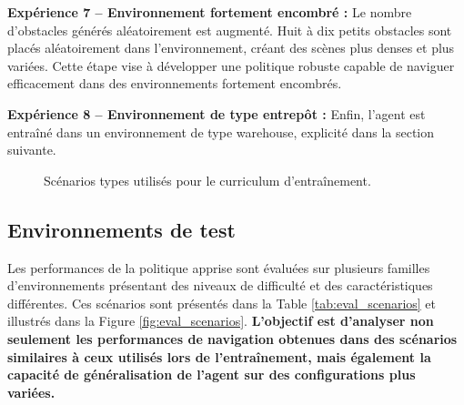 \vspace{10pt}

\noindent \textbf{Expérience 7 -- Environnement fortement encombré :} Le nombre d'obstacles générés aléatoirement est augmenté. Huit à dix petits obstacles sont placés aléatoirement dans l'environnement, créant des scènes plus denses et plus variées. Cette étape vise à développer une politique robuste capable de naviguer efficacement dans des environnements fortement encombrés.

\vspace{10pt}

\noindent \textbf{Expérience 8 -- Environnement de type entrepôt :} Enfin, l'agent est entraîné dans un environnement de type warehouse, explicité dans la section suivante.

\begin{figure}[h]
    \centering
    \caption{Scénarios types utilisés pour le curriculum d'entraînement.}
    \label{fig:training_scenarios}
\end{figure}



\subsection{Environnements de test}

\noindent Les performances de la politique apprise sont évaluées sur plusieurs familles d'environnements présentant des niveaux de difficulté et des caractéristiques différentes. Ces scénarios sont présentés dans la Table \ref{tab:eval_scenarios} et illustrés dans la Figure \ref{fig:eval_scenarios}. \textbf{L'objectif est d'analyser non seulement les performances de navigation obtenues dans des scénarios similaires à ceux utilisés lors de l'entraînement, mais également la capacité de généralisation de l'agent sur des configurations plus variées.}


